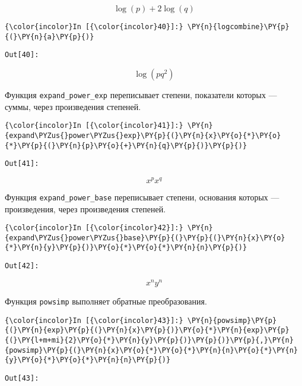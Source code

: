     \[\log{\left (p \right )} + 2 \log{\left (q \right )}\]

    

    \begin{Verbatim}[commandchars=\\\{\}]
{\color{incolor}In [{\color{incolor}40}]:} \PY{n}{logcombine}\PY{p}{(}\PY{n}{a}\PY{p}{)}
\end{Verbatim}
\texttt{\color{outcolor}Out[{\color{outcolor}40}]:}
    
    \[\log{\left (p q^{2} \right )}\]

    

    Функция \texttt{expand\_power\_exp} переписывает степени, показатели
которых --- суммы, через произведения степеней.

    \begin{Verbatim}[commandchars=\\\{\}]
{\color{incolor}In [{\color{incolor}41}]:} \PY{n}{expand\PYZus{}power\PYZus{}exp}\PY{p}{(}\PY{n}{x}\PY{o}{*}\PY{o}{*}\PY{p}{(}\PY{n}{p}\PY{o}{+}\PY{n}{q}\PY{p}{)}\PY{p}{)}
\end{Verbatim}
\texttt{\color{outcolor}Out[{\color{outcolor}41}]:}
    
    \[x^{p} x^{q}\]

    

    Функция \texttt{expand\_power\_base} переписывает степени, основания
которых --- произведения, через произведения степеней.

    \begin{Verbatim}[commandchars=\\\{\}]
{\color{incolor}In [{\color{incolor}42}]:} \PY{n}{expand\PYZus{}power\PYZus{}base}\PY{p}{(}\PY{p}{(}\PY{n}{x}\PY{o}{*}\PY{n}{y}\PY{p}{)}\PY{o}{*}\PY{o}{*}\PY{n}{n}\PY{p}{)}
\end{Verbatim}
\texttt{\color{outcolor}Out[{\color{outcolor}42}]:}
    
    \[x^{n} y^{n}\]

    

    Функция \texttt{powsimp} выполняет обратные преобразования.

    \begin{Verbatim}[commandchars=\\\{\}]
{\color{incolor}In [{\color{incolor}43}]:} \PY{n}{powsimp}\PY{p}{(}\PY{n}{exp}\PY{p}{(}\PY{n}{x}\PY{p}{)}\PY{o}{*}\PY{n}{exp}\PY{p}{(}\PY{l+m+mi}{2}\PY{o}{*}\PY{n}{y}\PY{p}{)}\PY{p}{)}\PY{p}{,}\PY{n}{powsimp}\PY{p}{(}\PY{n}{x}\PY{o}{*}\PY{o}{*}\PY{n}{n}\PY{o}{*}\PY{n}{y}\PY{o}{*}\PY{o}{*}\PY{n}{n}\PY{p}{)}
\end{Verbatim}
\texttt{\color{outcolor}Out[{\color{outcolor}43}]:}
    
